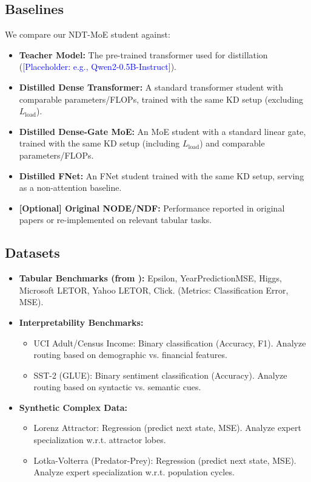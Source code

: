 \documentclass[11pt,a4paper]{article}
\newcommand{\placeholder}[1]{\textcolor{blue}{[Placeholder: #1]}}
\begin{document}
\subsection{Baselines}
We compare our NDT-MoE student against:
\begin{itemize}
    \item \textbf{Teacher Model:} The pre-trained transformer used for distillation (\placeholder{e.g., Qwen2-0.5B-Instruct}).
    \item \textbf{Distilled Dense Transformer:} A standard transformer student with comparable parameters/FLOPs, trained with the same KD setup (excluding $L_{\text{load}}$).
    \item \textbf{Distilled Dense-Gate MoE:} An MoE student with a standard linear gate, trained with the same KD setup (including $L_{\text{load}}$) and comparable parameters/FLOPs.
    \item \textbf{Distilled FNet:} An FNet student \citep{leethorp2021fnet} trained with the same KD setup, serving as a non-attention baseline.
    \item \textbf{[Optional] Original NODE/NDF:} Performance reported in original papers \citep{popov2019neural, kontschieder2015deep} or re-implemented on relevant tabular tasks.
\end{itemize}

\subsection{Datasets}
\begin{itemize}
    \item \textbf{Tabular Benchmarks (from \citep{popov2019neural}):} Epsilon, YearPredictionMSE, Higgs, Microsoft LETOR, Yahoo LETOR, Click. (Metrics: Classification Error, MSE).
    \item \textbf{Interpretability Benchmarks:}
        \begin{itemize}
            \item UCI Adult/Census Income: Binary classification (Accuracy, F1). Analyze routing based on demographic vs. financial features.
            \item SST-2 (GLUE): Binary sentiment classification (Accuracy). Analyze routing based on syntactic vs. semantic cues.
        \end{itemize}
    \item \textbf{Synthetic Complex Data:}
        \begin{itemize}
            \item Lorenz Attractor: Regression (predict next state, MSE). Analyze expert specialization w.r.t. attractor lobes.
            \item Lotka-Volterra (Predator-Prey): Regression (predict next state, MSE). Analyze expert specialization w.r.t. population cycles.
        \end{itemize}
\end{itemize}
\end{document}
